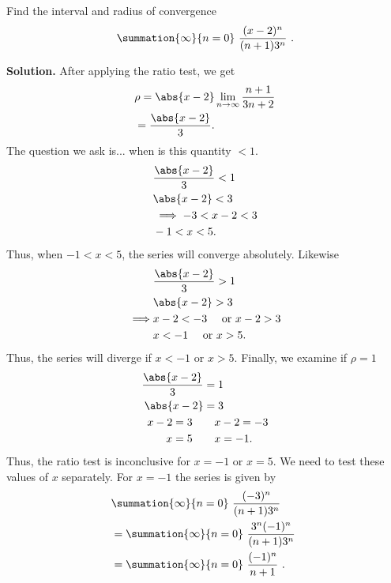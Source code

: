 \documentclass{report}
\begin{document}
    \pagebreak \bigbreak \noindent 
    \begin{eg}
        Find the interval and radius of convergence
        \begin{align*}
            \summation{\infty}{n=0}\ \frac{(x-2)^{n}}{(n+1)3^{n}}\ 
        .\end{align*}
    \end{eg}
    \bigbreak \noindent 
    \textbf{Solution.} After applying the ratio test, we get
    \begin{align*}
        &\rho = \abs{x-2}\lim\limits_{n \to \infty}{\frac{n+1}{3n+2}} \\
        &=\frac{\abs{x-2}}{3}
    .\end{align*}
    \bigbreak \noindent 
    The question we ask is... when is this quantity $<1 $. 
    \begin{align*}
        &\frac{\abs{x-2}}{3} < 1 \\
        &\abs{x-2} < 3 \\
        &\implies -3 < x-2 < 3 \\
        &-1 < x < 5
    .\end{align*}
    \bigbreak \noindent 
    Thus, when $-1 < x < 5$, the series will converge absolutely. Likewise
    \begin{align*}
        &\frac{\abs{x-2}}{3} > 1 \\
        &\abs{x-2} > 3 \\
        \implies &x-2 < -3 \quad \text{ or } x-2 > 3 \\
        &x < -1 \quad \text{ or } x > 5
    .\end{align*}
    \bigbreak \noindent 
    Thus, the series will diverge if $x < -1$ or $x > 5$. Finally, we examine if $\rho = 1$
    \begin{align*}
        \frac{\abs{x-2}}{3} &= 1 \\
        \abs{x-2} &= 3 \\
        x-2 = 3 \quad &\quad x-2 = -3 \\
        x=5 \quad &\quad x=-1
    .\end{align*}
    \bigbreak \noindent 
    Thus, the ratio test is inconclusive for $x = -1$ or $x=5$. We need to test these values of $x$ separately. For $x=-1$ the series is given by
    \begin{align*}
        &\summation{\infty}{n=0}\ \frac{(-3)^{n}}{(n+1)3^{n}}\  \\
        &=\summation{\infty}{n=0}\ \frac{3^{n}(-1)^{n}}{(n+1)3^{n}}\  \\
        &=\summation{\infty}{n=0}\ \frac{(-1)^{n}}{n+1}\  
    .\end{align*}
\end{document}
